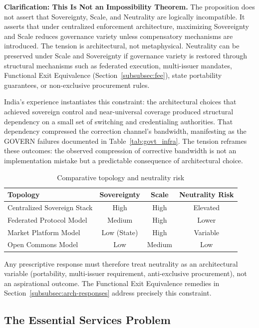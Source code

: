 \documentclass{article}
\begin{document}
\textbf{Clarification: This Is Not an Impossibility Theorem.} The proposition does not assert that Sovereignty, Scale, and Neutrality are logically incompatible. It asserts that under centralized enforcement architecture, maximizing Sovereignty and Scale reduces governance variety unless compensatory mechanisms are introduced. The tension is architectural, not metaphysical. Neutrality can be preserved under Scale and Sovereignty if governance variety is restored through structural mechanisms such as federated execution, multi-issuer mandates, Functional Exit Equivalence (Section~\ref{subsubsec:fee}), state portability guarantees, or non-exclusive procurement rules.

India's experience instantiates this constraint: the architectural choices that achieved sovereign control and near-universal coverage produced structural dependency on a small set of switching and credentialing authorities. That dependency compressed the correction channel's bandwidth, manifesting as the GOVERN failures documented in Table~\ref{tab:govt_infra}. The tension reframes these outcomes: the observed compression of corrective bandwidth is not an implementation mistake but a predictable consequence of architectural choice.

\begin{table}[htbp]
\centering
\small
\caption{Comparative topology and neutrality risk}
\label{tab:topology-risk}
\begin{tabular}{lccc}
\toprule
\textbf{Topology} & \textbf{Sovereignty} & \textbf{Scale} & \textbf{Neutrality Risk} \\
\midrule
Centralized Sovereign Stack & High & High & Elevated \\
Federated Protocol Model & Medium & High & Lower \\
Market Platform Model & Low (State) & High & Variable \\
Open Commons Model & Low & Medium & Low \\
\bottomrule
\end{tabular}
\end{table}

Any prescriptive response must therefore treat neutrality as an architectural variable (portability, multi-issuer requirement, anti-exclusive procurement), not an aspirational outcome. The Functional Exit Equivalence remedies in Section~\ref{subsubsec:arch-responses} address precisely this constraint.

\subsection{The Essential Services Problem}
\label{subsec:essential}
\end{document}
